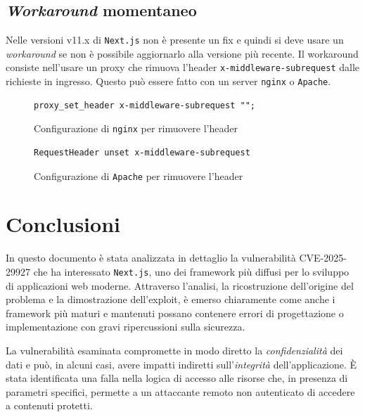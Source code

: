 \documentclass[a4paper,oneside,12pt]{report}
\begin{document}
\section{\textit{Workaround} momentaneo}
\label{sec:workaround-momentaneo}

Nelle versioni v11.x di \texttt{Next.js} non \`e presente un fix e quindi si deve usare un \textit{workaround} se non \`e possibile aggiornarlo alla versione pi\`u recente. Il workaround consiste nell'usare un proxy che rimuova l'header \texttt{x-middleware-subrequest} dalle richieste in ingresso. Questo pu\`o essere fatto con un server \texttt{nginx} o \texttt{Apache}.

\begin{figure}[H]
	\centering
	\begin{verbatim}
proxy_set_header x-middleware-subrequest "";
	\end{verbatim}
	\caption{Configurazione di \texttt{nginx} per rimuovere l'header}
	\label{fig:nginx-workaround}
\end{figure}

\begin{figure}[H]
	\centering
	\begin{verbatim}
RequestHeader unset x-middleware-subrequest
	\end{verbatim}
	\caption{Configurazione di \texttt{Apache} per rimuovere l'header}
	\label{fig:apache-workaround}
\end{figure}

\chapter*{Conclusioni}
\label{chap:conclusioni}
\justifying

In questo documento è stata analizzata in dettaglio la vulnerabilità CVE-2025-29927 che ha interessato \texttt{Next.js}, uno dei framework più diffusi per lo sviluppo di applicazioni web moderne. Attraverso l’analisi, la ricostruzione dell’origine del problema e la dimostrazione dell’exploit, è emerso chiaramente come anche i framework più maturi e mantenuti possano contenere errori di progettazione o implementazione con gravi ripercussioni sulla sicurezza.

La vulnerabilità esaminata compromette in modo diretto la \emph{confidenzialità} dei dati e può, in alcuni casi, avere impatti indiretti sull’\emph{integrità} dell’applicazione. È stata identificata una falla nella logica di accesso alle risorse che, in presenza di parametri specifici, permette a un attaccante remoto non autenticato di accedere a contenuti protetti.
\end{document}
